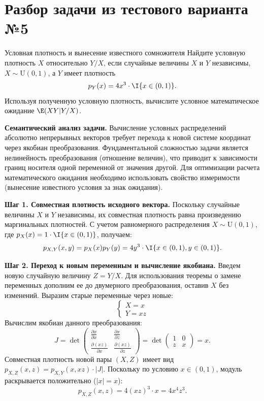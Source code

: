 \section*{Разбор задачи из тестового варианта №5}
\begin{Task}{Условная плотность и вынесение известного сомножителя}{}
    Найдите условную плотность $X$ относительно $Y/X$, если случайные величины $X$ и $Y$ независимы, $X \sim \text{U}(0, 1)$, а $Y$ имеет плотность
    \[
        p_Y(x) = 4x^3 \cdot \I\{x \in (0, 1)\}.
    \]
    Используя полученную условную плотность, вычислите условное математическое ожидание $\E(XY|Y/X)$.
\end{Task}

\begin{Solution}
    \textbf{Семантический анализ задачи.} Вычисление условных распределений абсолютно непрерывных векторов требует перехода к новой системе координат через якобиан преобразования. Фундаментальной сложностью задачи является нелинейность преобразования (отношение величин), что приводит к зависимости границ носителя одной переменной от значения другой. Для оптимизации расчета математического ожидания необходимо использовать свойство измеримости (вынесение известного условия за знак ожидания).

    \textbf{Шаг 1. Совместная плотность исходного вектора.}
    Поскольку случайные величины $X$ и $Y$ независимы, их совместная плотность равна произведению маргинальных плотностей. С учетом равномерного распределения $X \sim \text{U}(0, 1)$, где $p_X(x) = 1 \cdot \I\{x \in (0, 1)\}$, получаем:
    \[
        p_{X,Y}(x, y) = p_X(x)p_Y(y) = 4y^3 \cdot \I\{x \in (0, 1), y \in (0, 1)\}.
    \]

    \textbf{Шаг 2. Переход к новым переменным и вычисление якобиана.}
    Введем новую случайную величину $Z = Y/X$. Для использования теоремы о замене переменных дополним ее до двумерного преобразования, оставив $X$ без изменений. Выразим старые переменные через новые:
    \[
        \begin{cases}
            X = x \\
            Y = xz
        \end{cases}
    \]
    Вычислим якобиан данного преобразования:
    \[
        J = \det \begin{pmatrix}
            \frac{\partial x}{\partial x} & \frac{\partial x}{\partial z} \\[1em]
            \frac{\partial (xz)}{\partial x} & \frac{\partial (xz)}{\partial z}
        \end{pmatrix} 
        = \det \begin{pmatrix}
            1 & 0 \\
            z & x
        \end{pmatrix} = x.
    \]
    Совместная плотность новой пары $(X, Z)$ имеет вид $p_{X,Z}(x, z) = p_{X,Y}(x, xz) \cdot |J|$. Поскольку по условию $x \in (0, 1)$, модуль раскрывается положительно ($|x| = x$):
    \[
        p_{X,Z}(x, z) = 4(xz)^3 \cdot x = 4x^4z^3.
    \]


\end{Solution}

